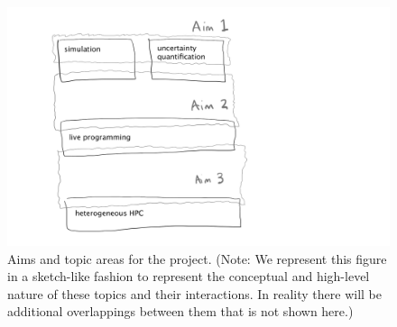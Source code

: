  
 
 
\begin{figure}
  \begin{center}
    \includegraphics[scale=0.17]{figures/aims-figure.png}%
    \caption{Aims and topic areas for the project. (Note: We represent this figure in a sketch-like fashion to represent the conceptual and high-level nature of these topics and their interactions. In reality there will be additional overlappings between them that is not shown here.)}\label{projectFig}
  \end{center}
\end{figure}

